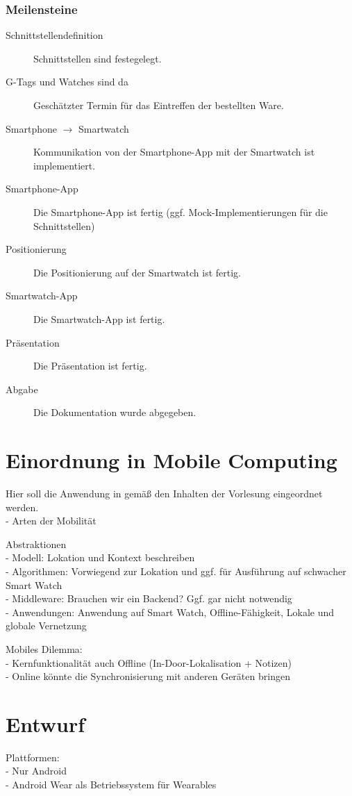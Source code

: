 \subsubsection{Meilensteine}
\begin{description}
	\item[Schnittstellendefinition] Schnittstellen sind festegelegt.
	\item[G-Tags und Watches sind da] Geschätzter Termin für das Eintreffen der bestellten Ware.
	\item[Smartphone $\rightarrow$ Smartwatch] Kommunikation von der Smartphone-App mit der Smartwatch ist implementiert.
	\item[Smartphone-App] Die Smartphone-App ist fertig (ggf. Mock-Implementierungen für die Schnittstellen)
	\item[Positionierung] Die Positionierung auf der Smartwatch ist fertig.
	\item[Smartwatch-App] Die Smartwatch-App ist fertig.
	\item[Präsentation] Die Präsentation ist fertig.
	\item[Abgabe] Die Dokumentation wurde abgegeben.
\end{description}


\section{Einordnung in Mobile Computing}
Hier soll die Anwendung in gemäß den Inhalten der Vorlesung eingeordnet werden.
\\- Arten der Mobilität

Abstraktionen
\\- Modell: Lokation und Kontext beschreiben
\\- Algorithmen: Vorwiegend zur Lokation und ggf. für Ausführung auf schwacher Smart Watch
\\- Middleware: Brauchen wir ein Backend? Ggf. gar nicht notwendig
\\- Anwendungen: Anwendung auf Smart Watch, Offline-Fähigkeit, Lokale und globale Vernetzung

Mobiles Dilemma:
\\- Kernfunktionalität auch Offline (In-Door-Lokalisation + Notizen)
\\- Online könnte die Synchronisierung mit anderen Geräten bringen

\section{Entwurf}
Plattformen:
\\- Nur Android
\\- Android Wear als Betriebssystem für Wearables

